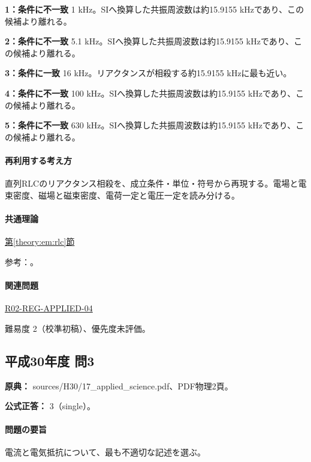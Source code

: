 \noindent\textbf{1：条件に不一致} 1 kHz。SIへ換算した共振周波数は約15.9155 kHzであり、この候補より離れる。\par

\noindent\textbf{2：条件に不一致} 5.1 kHz。SIへ換算した共振周波数は約15.9155 kHzであり、この候補より離れる。\par

\noindent\textbf{3：条件に一致} 16 kHz。リアクタンスが相殺する約15.9155 kHzに最も近い。\par

\noindent\textbf{4：条件に不一致} 100 kHz。SIへ換算した共振周波数は約15.9155 kHzであり、この候補より離れる。\par

\noindent\textbf{5：条件に不一致} 630 kHz。SIへ換算した共振周波数は約15.9155 kHzであり、この候補より離れる。\par

\paragraph{再利用する考え方} 直列RLCのリアクタンス相殺を、成立条件・単位・符号から再現する。電場と電束密度、磁場と磁束密度、電荷一定と電圧一定を読み分ける。

\paragraph{共通理論} \hyperref[theory:em:rlc]{第\ref*{theory:em:rlc}節}

\par 参考：\cite{mit_em12}。

\paragraph{関連問題} \hyperref[q:r02-reg-applied-04]{R02-REG-APPLIED-04}

\par 難易度 2（校準初稿）、優先度未評価。

\subsection{平成30年度 問3}
\label{q:h30-reg-applied-03}

\noindent\textbf{原典：} sources/H30/17\_applied\_science.pdf、PDF物理2頁。

\textbf{公式正答：} 3（single）。

\paragraph{問題の要旨} 電流と電気抵抗について、最も不適切な記述を選ぶ。

